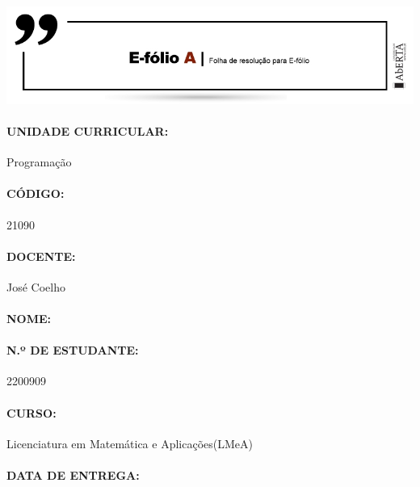 \includegraphics[width=\textwidth]{./images/e-folio-a.jpg}

\paragraph{\textbf{UNIDADE CURRICULAR:}} Programação

\paragraph{\textbf{CÓDIGO:}} 21090

\paragraph{\textbf{DOCENTE:}} José Coelho

\paragraph{\textbf{NOME:}} \theauthor

\paragraph{\textbf{N.º DE ESTUDANTE:}} 2200909

\paragraph{\textbf{CURSO:}} Licenciatura em Matemática e Aplicações(LMeA)

\paragraph{\textbf{DATA DE ENTREGA:} \thedate}
